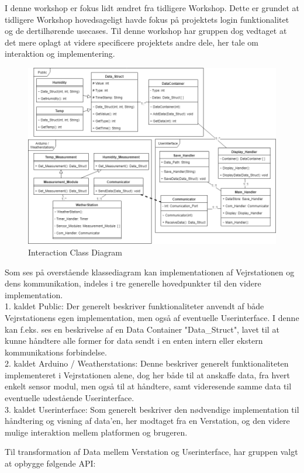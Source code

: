 \noindent
I denne workshop er fokus lidt ændret fra tidligere Workshop. Dette er grundet at tidligere Workshop hovedsageligt havde fokus på projektets login funktionalitet og de dertilhørende usecases. Til denne workshop har gruppen dog vedtaget at det mere oplagt at videre specificere projektets andre dele, her tale om interaktion og implementering.

\begin{figure}[H]
    \centering
    \includegraphics[width=1\textwidth, angle =0]{Struktureret_System_Udvikling/Workshop_2/Assets/Workshop2_ClassDiagram.png}
    \caption{Interaction Class Diagram}
    \label{fig:my_label}
\end{figure}

\noindent
Som ses på overstående klassediagram kan implementationen af Vejrstationen og dens kommunikation, indeles i tre generelle hovedpunkter til den videre implementation.\\
1. kaldet Public:
Der generelt beskriver funktionaliteter anvendt af både Vejrstationens egen implementation, men også af eventuelle Userinterface.
I denne kan f.eks. ses en beskrivelse af en Data Container "Data\_Struct", lavet til at kunne håndtere alle former for data sendt i en enten intern eller ekstern kommunikations forbindelse.\\
2. kaldet Arduino / Weatherstations:
Denne beskriver generelt funktionaliteten implementeret i Vejrstationen alene, dog her både til at anskaffe data, fra hvert enkelt sensor modul, men også til at håndtere, samt videresende samme data til eventuelle udestående Userinterface.\\
3. kaldet Userinterface:
Som generelt beskriver den nødvendige implementation til håndtering og visning af data'en, her modtaget fra en Verstation, og den videre mulige interaktion mellem platformen og brugeren.

Til transformation af Data mellem Verstation og Userinterface, har gruppen valgt at opbygge følgende API:
